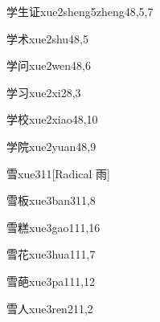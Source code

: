 \begin{verbete}{学生证}{xue2sheng5zheng4}{8,5,7}
\end{verbete}

\begin{verbete}{学术}{xue2shu4}{8,5}
\end{verbete}

\begin{verbete}{学问}{xue2wen4}{8,6}
\end{verbete}

\begin{verbete}{学习}{xue2xi2}{8,3}
\end{verbete}

\begin{verbete}{学校}{xue2xiao4}{8,10}
\end{verbete}

\begin{verbete}{学院}{xue2yuan4}{8,9}
\end{verbete}

\begin{verbete}{雪}{xue3}{11}[Radical 雨]
\end{verbete}

\begin{verbete}{雪板}{xue3ban3}{11,8}
\end{verbete}

\begin{verbete}{雪糕}{xue3gao1}{11,16}
\end{verbete}

\begin{verbete}{雪花}{xue3hua1}{11,7}
\end{verbete}

\begin{verbete}{雪葩}{xue3pa1}{11,12}
\end{verbete}

\begin{verbete}{雪人}{xue3ren2}{11,2}
\end{verbete}

